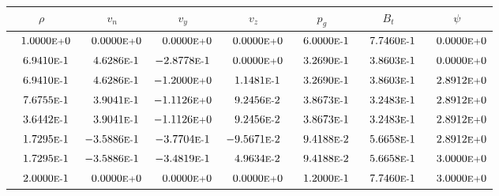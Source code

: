 \begin{tabular*}{\textwidth}{@{\extracolsep{\fill}} ccccccc}
\\ 
\hline 
\hline 
$\rho$ & $v_n$ & $v_y$ & $v_z$ & $p_g$ & $B_t$ & $\psi$ \\ 
\hline 
$\phantom{-} 1.0000\mbox{\sc{e}\smaller{+}}0$ & $\phantom{-} 0.0000\mbox{\sc{e}\smaller{+}}0$ & $\phantom{-} 0.0000\mbox{\sc{e}\smaller{+}}0$ & $\phantom{-} 0.0000\mbox{\sc{e}\smaller{+}}0$ & $\phantom{-} 6.0000\mbox{\sc{e}\smaller{-}}1$ & $\phantom{-} 7.7460\mbox{\sc{e}\smaller{-}}1$ & $\phantom{-} 0.0000\mbox{\sc{e}\smaller{+}}0$ \\ 
$\phantom{-} 6.9410\mbox{\sc{e}\smaller{-}}1$ & $\phantom{-} 4.6286\mbox{\sc{e}\smaller{-}}1$ & $-2.8778\mbox{\sc{e}\smaller{-}}1$ & $\phantom{-} 0.0000\mbox{\sc{e}\smaller{+}}0$ & $\phantom{-} 3.2690\mbox{\sc{e}\smaller{-}}1$ & $\phantom{-} 3.8603\mbox{\sc{e}\smaller{-}}1$ & $\phantom{-} 0.0000\mbox{\sc{e}\smaller{+}}0$ \\ 
$\phantom{-} 6.9410\mbox{\sc{e}\smaller{-}}1$ & $\phantom{-} 4.6286\mbox{\sc{e}\smaller{-}}1$ & $-1.2000\mbox{\sc{e}\smaller{+}}0$ & $\phantom{-} 1.1481\mbox{\sc{e}\smaller{-}}1$ & $\phantom{-} 3.2690\mbox{\sc{e}\smaller{-}}1$ & $\phantom{-} 3.8603\mbox{\sc{e}\smaller{-}}1$ & $\phantom{-} 2.8912\mbox{\sc{e}\smaller{+}}0$ \\ 
$\phantom{-} 7.6755\mbox{\sc{e}\smaller{-}}1$ & $\phantom{-} 3.9041\mbox{\sc{e}\smaller{-}}1$ & $-1.1126\mbox{\sc{e}\smaller{+}}0$ & $\phantom{-} 9.2456\mbox{\sc{e}\smaller{-}}2$ & $\phantom{-} 3.8673\mbox{\sc{e}\smaller{-}}1$ & $\phantom{-} 3.2483\mbox{\sc{e}\smaller{-}}1$ & $\phantom{-} 2.8912\mbox{\sc{e}\smaller{+}}0$ \\ 
$\phantom{-} 3.6442\mbox{\sc{e}\smaller{-}}1$ & $\phantom{-} 3.9041\mbox{\sc{e}\smaller{-}}1$ & $-1.1126\mbox{\sc{e}\smaller{+}}0$ & $\phantom{-} 9.2456\mbox{\sc{e}\smaller{-}}2$ & $\phantom{-} 3.8673\mbox{\sc{e}\smaller{-}}1$ & $\phantom{-} 3.2483\mbox{\sc{e}\smaller{-}}1$ & $\phantom{-} 2.8912\mbox{\sc{e}\smaller{+}}0$ \\ 
$\phantom{-} 1.7295\mbox{\sc{e}\smaller{-}}1$ & $-3.5886\mbox{\sc{e}\smaller{-}}1$ & $-3.7704\mbox{\sc{e}\smaller{-}}1$ & $-9.5671\mbox{\sc{e}\smaller{-}}2$ & $\phantom{-} 9.4188\mbox{\sc{e}\smaller{-}}2$ & $\phantom{-} 5.6658\mbox{\sc{e}\smaller{-}}1$ & $\phantom{-} 2.8912\mbox{\sc{e}\smaller{+}}0$ \\ 
$\phantom{-} 1.7295\mbox{\sc{e}\smaller{-}}1$ & $-3.5886\mbox{\sc{e}\smaller{-}}1$ & $-3.4819\mbox{\sc{e}\smaller{-}}1$ & $\phantom{-} 4.9634\mbox{\sc{e}\smaller{-}}2$ & $\phantom{-} 9.4188\mbox{\sc{e}\smaller{-}}2$ & $\phantom{-} 5.6658\mbox{\sc{e}\smaller{-}}1$ & $\phantom{-} 3.0000\mbox{\sc{e}\smaller{+}}0$ \\ 
$\phantom{-} 2.0000\mbox{\sc{e}\smaller{-}}1$ & $\phantom{-} 0.0000\mbox{\sc{e}\smaller{+}}0$ & $\phantom{-} 0.0000\mbox{\sc{e}\smaller{+}}0$ & $\phantom{-} 0.0000\mbox{\sc{e}\smaller{+}}0$ & $\phantom{-} 1.2000\mbox{\sc{e}\smaller{-}}1$ & $\phantom{-} 7.7460\mbox{\sc{e}\smaller{-}}1$ & $\phantom{-} 3.0000\mbox{\sc{e}\smaller{+}}0$ \\ 
\hline 
\end{tabular*} 
